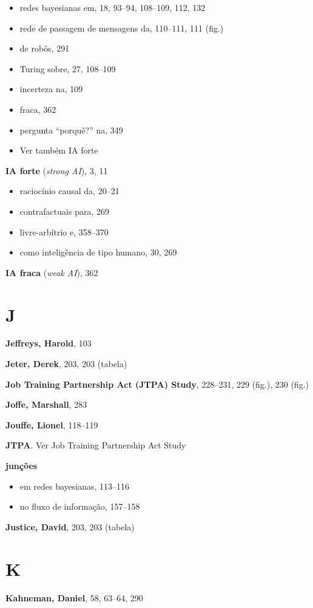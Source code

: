 \documentclass[11pt,a5paper,twoside]{book}
\begin{document}
\begin{itemize}
\item redes bayesianas em, 18, 93–94, 108–109, 112, 132
\item rede de passagem de mensagens da, 110–111, 111 (fig.)
\item de robôs, 291
\item Turing sobre, 27, 108–109
\item incerteza na, 109
\item fraca, 362
\item pergunta “porquê?” na, 349
\item Ver também IA forte
\end{itemize}
\textbf{IA forte} (\textit{strong AI}), 3, 11

\begin{itemize}
\item raciocínio causal da, 20–21
\item contrafactuais para, 269
\item livre-arbítrio e, 358–370
\item como inteligência de tipo humano, 30, 269
\end{itemize}
\textbf{IA fraca} (\textit{weak AI}), 362

\section{J}
\textbf{Jeffreys, Harold}, 103

\textbf{Jeter, Derek}, 203, 203 (tabela)

\textbf{Job Training Partnership Act (JTPA) Study}, 228–231, 229 (fig.), 230 (fig.)

\textbf{Joffe, Marshall}, 283

\textbf{Jouffe, Lionel}, 118–119

\textbf{JTPA}. Ver Job Training Partnership Act Study

\textbf{junções}

\begin{itemize}
\item em redes bayesianas, 113–116
\item no fluxo de informação, 157–158
\end{itemize}
\textbf{Justice, David}, 203, 203 (tabela)

\section{K}
\textbf{Kahneman, Daniel}, 58, 63–64, 290
\end{document}
